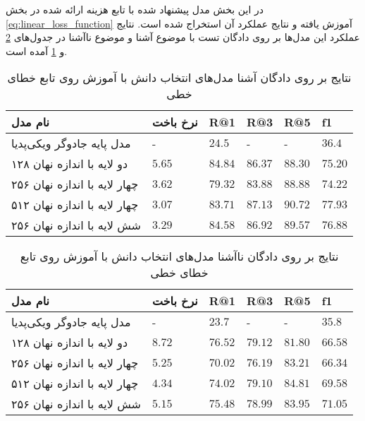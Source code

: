 در این بخش مدل‌ پیشنهاد شده با تابع هزینه ارائه شده در بخش 
\ref{eq:linear_loss_function}
آموزش یافته و نتایج عملکرد آن استخراج شده است. نتایج عملکرد این مدل‌ها بر روی دادگان تست با موضوع آشنا و موضوع ناآشنا در جدول‌های 
\ref{table:knowledge:lin:unseen}
و 
\ref{table:knowledge:lin:seen}
آمده است.

\begin{table}[h]
	\caption{نتایج بر روی دادگان آشنا مدل‌های انتخاب دانش با آموزش روی تابع خطای خطی }
	\centering
	\label{table:knowledge:lin:seen}
	\begin{tabular}{|l|l|l|l|l|l|}
		\hline
		نام مدل                      & نرخ باخت & R@1     & R@3     & R@5     & f1      \\ \hline
		مدل پایه جادوگر ویکی‌پدیا    & -       & $24.5$  & -       & -       & $36.4$  \\ \hline
		دو لایه با اندازه نهان ۱۲۸   & $5.65$  & $84.84$ & $86.37$ & $88.30$ & $75.20$ \\ \hline
		چهار لایه با اندازه نهان ۲۵۶ & $3.62$  & $79.32$ & $83.88$ & $88.88$ & $74.22$ \\ \hline
		چهار لایه با اندازه نهان ۵۱۲ & $3.07$  & $83.71$ & $87.13$ & $90.72$ & $77.93$ \\ \hline
		شش لایه با اندازه نهان ۲۵۶   & $3.29$  & $84.58$ & $86.92$ & $89.57$ & $76.88$ \\ \hline
	\end{tabular}
\end{table}

\begin{table}[h]
	\caption{نتایج بر روی دادگان ناآشنا مدل‌های انتخاب دانش با آموزش روی تابع خطای خطی }
	\centering
	\label{table:knowledge:lin:unseen}
	\begin{tabular}{|l|l|l|l|l|l|}
		\hline
		نام مدل                      & نرخ باخت & R@1     & R@3     & R@5     & f1      \\ \hline
		مدل پایه جادوگر ویکی‌پدیا    & -       & $23.7$  & -       & -       & $35.8$  \\ \hline
		دو لایه با اندازه نهان ۱۲۸   & $8.72$  & $76.52$ & $79.12$ & $81.80$ & $66.58$ \\ \hline
		چهار لایه با اندازه نهان ۲۵۶ & $5.25$  & $70.02$ & $76.19$ & $83.21$ & $66.34$ \\ \hline
		چهار لایه با اندازه نهان ۵۱۲ & $4.34$  & $74.02$ & $79.10$ & $84.81$ & $69.58$ \\ \hline
		شش لایه با اندازه نهان ۲۵۶   & $5.15$  & $75.48$ & $78.99$ & $83.95$ & $71.05$ \\ \hline
	\end{tabular}
\end{table}

